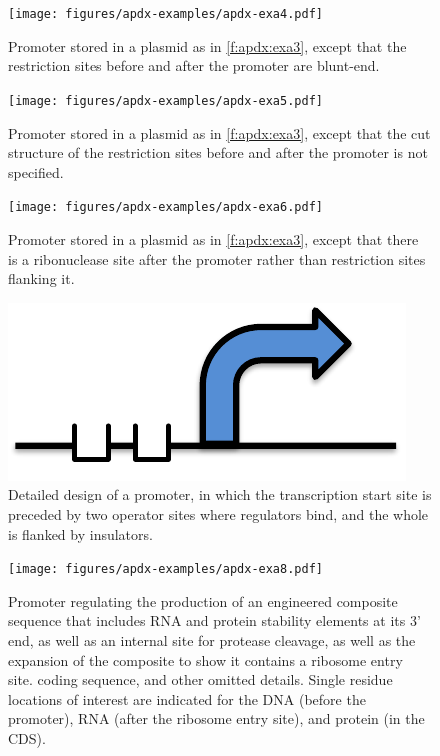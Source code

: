 \begin{figure}[h!]
\texttt{[image: figures/apdx-examples/apdx-exa4.pdf]}
\caption{Promoter stored in a plasmid as in \ref{f:apdx:exa3}, except that the restriction sites before and after the promoter are blunt-end.}
\label{f:apdx:exa4}
\end{figure}

\begin{figure}[h!]
\texttt{[image: figures/apdx-examples/apdx-exa5.pdf]}
\caption{Promoter stored in a plasmid as in \ref{f:apdx:exa3}, except that the cut structure of the restriction sites before and after the promoter is not specified.}
\label{f:apdx:exa5}
\end{figure}

\begin{figure}[h!]
\texttt{[image: figures/apdx-examples/apdx-exa6.pdf]}
\caption{Promoter stored in a plasmid as in \ref{f:apdx:exa3}, except that there is a ribonuclease site after the promoter rather than restriction sites flanking it.}
\label{f:apdx:exa6}
\end{figure}

\begin{figure}[h!]
\includegraphics[scale=0.5]{figures/apdx-examples/apdx-exa7.pdf}
\caption{Detailed design of a promoter, in which the transcription start site is preceded by two operator sites where regulators bind, and the whole is flanked by insulators.}
\label{f:apdx:exa7}
\end{figure}

\begin{figure}[h!]
\texttt{[image: figures/apdx-examples/apdx-exa8.pdf]}
\caption{Promoter regulating the production of an engineered composite sequence that includes RNA and protein stability elements at its 3' end, as well as an internal site for protease cleavage, as well as the expansion of the composite to show it contains a ribosome entry site. coding sequence, and other omitted details.  Single residue locations of interest are indicated for the DNA (before the promoter), RNA (after the ribosome entry site), and protein (in the CDS).}
\label{f:apdx:exa8}
\end{figure}

